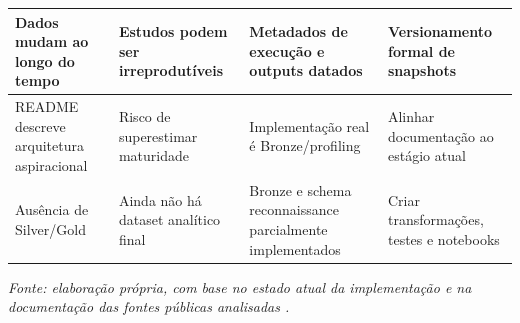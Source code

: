 \begin{table}[htbp]
{\begin{tabular}{|>{\RaggedRight\arraybackslash}p{3.5cm}|>{\RaggedRight\arraybackslash}p{3.5cm}|>{\RaggedRight\arraybackslash}p{4.4cm}|>{\RaggedRight\arraybackslash}p{3.8cm}|}
            \hline
            Dados mudam ao longo do tempo            & Estudos podem ser irreprodutíveis                          & Metadados de execução e outputs datados                   & Versionamento formal de snapshots                                                            \\
            \hline
            README descreve arquitetura aspiracional & Risco de superestimar maturidade                           & Implementação real é Bronze/profiling                     & Alinhar documentação ao estágio atual                                                        \\
            \hline
            Ausência de Silver/Gold                  & Ainda não há dataset analítico final                       & Bronze e schema reconnaissance parcialmente implementados & Criar transformações, testes e notebooks                                                     \\
            \hline
        \end{tabular}%
    }

    \vspace{0.2cm}
    \footnotesize
    \textit{Fonte: elaboração própria, com base no estado atual da implementação e na documentação das fontes públicas analisadas \cite{databricks_medallion_architecture,jiang_2021_data_inconsistency,allodi_massacci_2014_cvss_exploits,first_epss}.}

\end{table}

